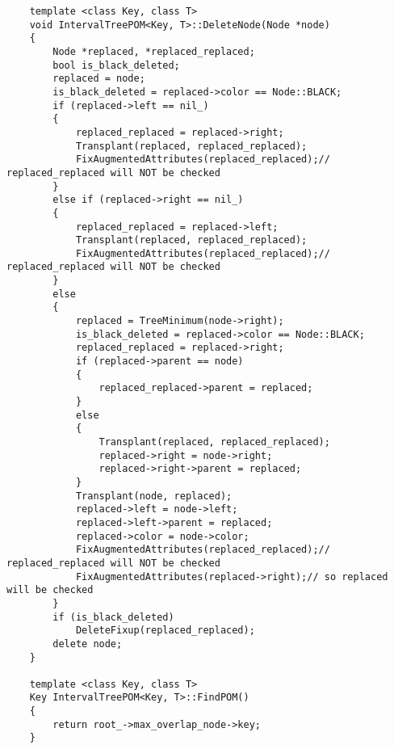 \begin{verbatim}
    template <class Key, class T>
    void IntervalTreePOM<Key, T>::DeleteNode(Node *node)
    {
        Node *replaced, *replaced_replaced;
        bool is_black_deleted;
        replaced = node;
        is_black_deleted = replaced->color == Node::BLACK;
        if (replaced->left == nil_)
        {
            replaced_replaced = replaced->right;
            Transplant(replaced, replaced_replaced);
            FixAugmentedAttributes(replaced_replaced);// replaced_replaced will NOT be checked
        }
        else if (replaced->right == nil_)
        {
            replaced_replaced = replaced->left;
            Transplant(replaced, replaced_replaced);
            FixAugmentedAttributes(replaced_replaced);// replaced_replaced will NOT be checked
        }
        else
        {
            replaced = TreeMinimum(node->right);
            is_black_deleted = replaced->color == Node::BLACK;
            replaced_replaced = replaced->right;
            if (replaced->parent == node)
            {
                replaced_replaced->parent = replaced;
            }
            else
            {
                Transplant(replaced, replaced_replaced);
                replaced->right = node->right;
                replaced->right->parent = replaced;
            }
            Transplant(node, replaced);
            replaced->left = node->left;
            replaced->left->parent = replaced;
            replaced->color = node->color;
            FixAugmentedAttributes(replaced_replaced);// replaced_replaced will NOT be checked
            FixAugmentedAttributes(replaced->right);// so replaced will be checked
        }
        if (is_black_deleted)
            DeleteFixup(replaced_replaced);
        delete node;
    }

    template <class Key, class T>
    Key IntervalTreePOM<Key, T>::FindPOM()
    {
        return root_->max_overlap_node->key;
    }
\end{verbatim}


